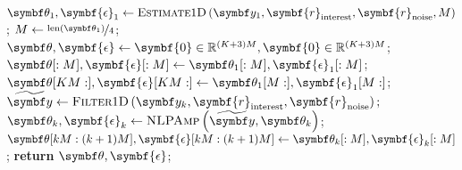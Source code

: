 \begin{algorithm}
    \caption[
        Routine for estimating a sequence of \ac{1D} \acsp{FID} which exhibit
        variation in amplitudes across increments.
    ]
    {
        Routine for estimating a sequence of \ac{1D} \acsp{FID} which exhibit
        variation in amplitudes across increments.
        \textsc{NLPAmp} denotes a
        routine which is akin to \textsc{NLP} (\cref{alg:nlp}), except
        only amplitudes are optimised; phases, frequencies and damping factors
        are fixed.
    }
    \label{alg:estimate-seq}
    \begin{algorithmic}[1]
        \State $\bth_{1}, \symbf{\epsilon}_{1} \gets \textsc{Estimate$1$D}\left(
            \by_1, \symbf{r}_{\text{interest}}, \symbf{r}_{\text{noise}}, M
            \right)
        $;
        \State $M \gets \nicefrac{\text{len}(\bth_{1})}{4}$;
        \State $\bth, \symbf{\epsilon} \gets  \symbf{0} \in \mathbb{R}^{(K + 3)M}, \symbf{0} \in \mathbb{R}^{(K + 3)M}$;
        \State $\bth[:M], \symbf{\epsilon}[:M] \gets \bth_1[:M], \symbf{\epsilon}_1[:M]$;
        \State $\bth[KM:], \symbf{\epsilon}[KM:] \gets \bth_1[M:], \symbf{\epsilon}_1[M:]$;
            \State $\widetilde{\by} \gets \textsc{Filter$1$D}\left(
                \by_k,
                \symbf{r}_{\text{interest}},
                \symbf{r}_{\text{noise}}
                \right);
                $
            \State $\bth_{k}, \symbf{\epsilon}_{k} \gets
            \textsc{NLPAmp}\left(\widetilde{\by}, \bth_{k}\right)$;
            \State $\bth[kM : (k+1)M], \symbf{\epsilon}[kM : (k+1)M] \gets \bth_k[:M], \symbf{\epsilon}_k[:M]$;
        \EndFor
        \State \textbf{return} $\bth, \symbf{\epsilon}$;
        \EndProcedure
    \end{algorithmic}
\end{algorithm}



